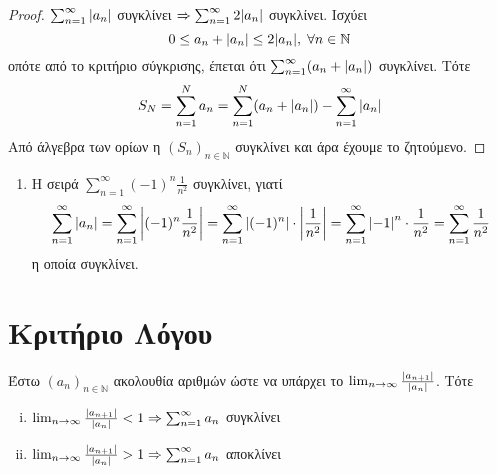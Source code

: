 \documentclass[a4paper,table]{report}
\begin{document}
\begin{proof}
  $ \sum_{n=1}^{\infty} \abs{a_{n}} $ συγκλίνει $ \Rightarrow \sum_{n=1}^{\infty} 2 
  \abs{a_{n}} $ συγκλίνει. Ισχύει
    \[
        0 \leq a_{n} + \abs{a_{n}} \leq 2 \abs{a_{n}}, \; \forall n \in \mathbb{N} 
    \] 
    οπότε από το κριτήριο σύγκρισης, έπεται ότι $ \sum_{n=1}^{\infty} (a_{n}+ 
    \abs{a_{n}}) $ συγκλίνει. Τότε
    \[
        S_{N} = \sum_{n=1}^{N} a_{n} = \sum_{n=1}^{N} (a_{n}+ \abs{a_{n}}) - 
        \sum_{n=1}^{\infty} \abs{a_{n}}   
    \] 
    Από άλγεβρα των ορίων η $ {(S_{n})}_{n \in \mathbb{N}} $ συγκλίνει και άρα 
    έχουμε το ζητούμενο.
\end{proof}

\begin{examples}
\item {}
    \begin{enumerate}
        \item Η σειρά $ \sum_{n=1}^{\infty} (-1)^{n} \frac{1}{n^{2}} $ συγκλίνει, 
            γιατί 
            \[ 
                \sum_{n=1}^{\infty} \abs{a_{n}} = \sum_{n=1}^{\infty} \abs{(-1)^{n}
                \frac{1}{n^{2}}} = \sum_{n=1}^{\infty} \abs{(-1)^{n}} 
                \cdot \abs{\frac{1}{n^{2}} } =  
                \sum_{n=1}^{\infty} \abs{-1}^{n} \cdot 
                \frac{1}{n^{2}} = \sum_{n=1}^{\infty} \frac{1}{n^{2}} 
            \]
            η οποία συγκλίνει.
    \end{enumerate}
\end{examples}


\section{Κριτήριο Λόγου}

\begin{mybox3}
\begin{prop}
Έστω $ {(a_{n})}_{n \in \mathbb{N}} $ ακολουθία αριθμών ώστε να υπάρχει το $ 
    \lim_{n \to \infty} \frac{\abs{a_{n+1}}}{\abs{a_{n}}} $. Τότε 
    \begin{enumerate}[i)]
        \item $ \lim_{n \to \infty} \frac{\abs{a_{n+1}}}{\abs{a_{n}}} <1 \Rightarrow 
            \sum_{n=1}^{\infty} a_{n}$ συγκλίνει 
        \item $ \lim_{n \to \infty} \frac{\abs{a_{n+1}}}{\abs{a_{n}}} >1 \Rightarrow 
            \sum_{n=1}^{\infty} a_{n}$ αποκλίνει
\end{enumerate}
\end{prop}
\end{mybox3}
\end{document}
